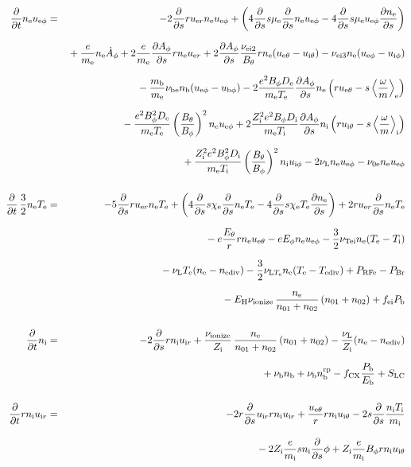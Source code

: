 \documentclass[11pt]{article}
\def\r#1{{\rm#1}}
\def\ddt{\frac{\partial}{\partial t}}
\def\dds{\frac{\partial}{\partial s}}
\def\dd#1{\frac{\partial #1}{\partial s}}
\def\ave#1{\left\langle#1\right\rangle}
\def\me{m_\r{e}}
\def\mi{m_\r{i}}
\def\mb{m_\r{b}}
\def\mue{\mu_\r{e}}
\def\De{D_\r{e}}
\def\Di{D_\r{i}}
\def\chie{\chi_\r{e}}
\def\ne{n_\r{e}}
\def\ni{n_\r{i}}
\def\nb{n_\r{b}}
\def\uer{u_{\r{e}r}}
\def\uir{u_{\r{i}r}}
\def\ueth{u_{\r{e}\theta}}
\def\uith{u_{\r{i}\theta}}
\def\ueph{u_{\r{e}\phi}}
\def\uiph{u_{\r{i}\phi}}
\def\ubph{u_{\r{b}\phi}}
\def\Eth{E_\theta}
\def\Eph{E_\phi}
\def\Bth{B_\theta}
\def\Bph{B_\phi}
\def\Aphd{\dot{A}_\phi}
\def\Aph{A_\phi}
\def\Te{T_\r{e}}
\def\Ti{T_\r{i}}
\def\nna{n_{01}}
\def\nnb{n_{02}}
\def\Zi{Z_\r{i}}
\def\Pb{P_\r{b}}
\def\Eb{E_\r{b}}
\def\PRFe{P_\r{RFe}}
\def\PBr{P_\r{Br}}
\def\EH{E_\r{H}}
\def\fei{f_\r{ei}}
\def\nbrp{n_\r{b}^\r{rp}}
\def\fCX{f_\r{CX}}
\def\nube{\nu_\r{be}}
\def\nune{\nu_\r{0e}}
\def\nuL{\nu_\r{L}}
\def\nuion{\nu_\r{ionize}}
\def\nub{\nu_\r{b}}
\def\nuTei{\nu_\r{Tei}}
\def\vb{v_\r{b}}
\def\nediv{n_\r{ediv}}
\def\Tediv{T_\r{ediv}}
\def\nuLTe{\nu_{\r{L}T_\r{e}}}
\begin{document}
\begin{eqnarray}
%
%
  \ddt \ne \ueph &=&
%
  - 2 \dds r \uer \ne \ueph
%
  + \left(   4 \dds s \mue \dds \ne \ueph
%
           - 4 \dds s \mue \ueph \dd{\ne} \right)
\nonumber\\[2.5mm]&&{}
%
  + \frac{e}{\me} \ne \Aphd
%
  + 2 \frac{e}{\me} \dd{\Aph} r \ne \uer 
%
  + 2 \dd{\Aph} \frac{\nu_\r{ei2}}{\Bth} r \ne (\ueth - \uith)
%
  - \nu_\r{ei3} \ne (\ueph - \uiph)
\nonumber\\[2.5mm]&&{}
%
  - \frac{\mb}{\me} \nube \nb (\ueph - \ubph)
%
  - 2\frac{e^2 \Bph \De}{\me\Te}\dd{\Aph}\ne
    \left(r \ueth - s \ave{\frac{\omega}{m}}_\r{e} \right)
\nonumber\\[2.5mm]&&{}
%
  - \frac{e^2 \Bph^2 \De}{\me\Te}\left(\frac{\Bth}{\Bph}\right)^2\ne\ueph
%
   + 2\frac{\Zi^2 e^2 \Bph \Di}{\me\Ti}\dd{\Aph}\ni
    \left(r \uith - s \ave{\frac{\omega}{m}}_\r{i} \right)
\nonumber\\[2.5mm]&&{}
%
   + \frac{\Zi^2 e^2 \Bph^2
   \Di}{\me\Ti}\left(\frac{\Bth}{\Bph}\right)^2\ni\uiph
%
  - 2 \nuL \ne \ueph
%
  - \nune \ne \ueph
%
%
\\[5mm]
%
%
  \ddt \, \frac{3}{2} \ne \Te &=&
%
   - 5 \dds r \uer \ne \Te
%
   + \left(   4 \dds s \chie \dds \ne \Te
%
            - 4 \dds s \chie \Te \dd{\ne} \right)
%
  + 2 r \uer \dds \ne \Te
%
\nonumber\\[2.5mm]&&{}
%
  -  e \frac{\Eth}{r} r \ne \ueth
%
  -  e \Eph \ne \ueph 
%
  - \frac{3}{2} \nuTei \ne (\Te - \Ti)
%
%
\nonumber\\[2.5mm]&&{}
%
  - \nuL \Te (\ne - \nediv)
%
  - \frac{3}{2} \nuLTe \ne (\Te - \Tediv)
%
  + \PRFe
%
  - \PBr
\nonumber\\[2.5mm]&&{}
%
  - \EH \nuion\, \frac{\ne}{\nna+\nnb}\, (\nna+\nnb)
%
  + \fei \Pb
\\[5mm]
%
%
  \ddt \ni &=&
%
  - 2 \dds r \ni \uir
%
  + \frac{\nuion}{\Zi}\, \frac{\ne}{\nna+\nnb}\, (\nna+\nnb)
%
  - \frac{\nuL}{\Zi} (\ne - \nediv) 
\nonumber\\[2.5mm]&&{}
%
  + \nub \nb
%
  + \nub \nbrp
%
  - \fCX \frac{\Pb}{\Eb}
%
  + S_\r{LC}
\\[5mm]
%
%
  \ddt r \ni \uir &=&
%
  - 2 r \dds \uir r \ni \uir
%
  + \frac{\ueth}{r} r \ni \uith
%
  - 2 s \dds \frac{\ni \Ti}{\mi}
\nonumber\\[3mm]&&{}
%
  - 2 \Zi \frac{e}{\mi} s \ni \dds \phi
%
  + \Zi \frac{e}{\mi} \Bph r \ni \uith

\end{eqnarray}
\end{document}
